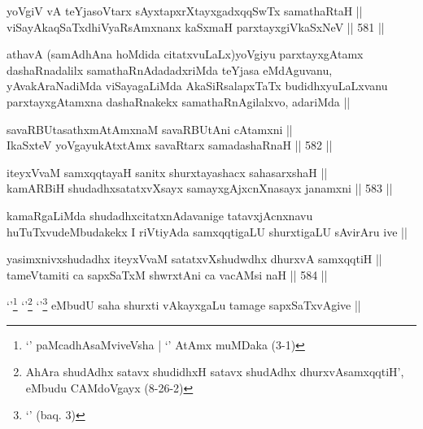 
\begin{shl}
yoVgiV vA teYjasoV\s tarx sAyxtapxrXtayxgadxqqSwTx samathaRtaH || \\
viSayAkaqSaTxdhiVyaRsAmxnanx kaSxmaH parxtayxgiVkaSxNeV ||  581 ||  
\end{shl}

\begin{artha}
athavA (samAdhAna hoMdida citatxvuLaLx)yoVgiyu parxtayxgAtamx
dashaRnadalilx samathaRnAdadadxriMda teYjasa eMdAguvanu,
yAvakAraNadiMda viSayagaLiMda AkaSiRsalapxTaTx budidhxyuLaLxvanu
parxtayxgAtamxna dashaRnakekx samathaRnAgilalxvo, adariMda ||
\end{artha}


\begin{shl}
savaRBUtasathxmAtAmxnaM savaRBUtAni cA\s \s tamxni || \\
IkaSxteV yoVgayukAtxtAmx savaRtarx samadashaRnaH ||  582 ||  
\end{shl}

\begin{shl}
iteyxVvaM samxqqtayaH sanitx shurxtayashacx sahasarxshaH || \\
kamARBiH shudadhxsatatxvXsayx samayxgAjxcnXnasayx janamxni ||  583 ||  
\end{shl}

\begin{artha}
kamaRgaLiMda shudadhxcitatxnAdavanige tatavxjAcnxnavu
huTuTxvudeMbudakekx I riVtiyAda samxqqtigaLU shurxtigaLU sAvirAru ive ||
\end{artha}


\begin{shl}
yasimxnivxshudadhx iteyxVvaM satatxvXshudwdhx dhurxvA samxqqtiH ||  \\
tameVtamiti ca sapxSaTxM shwrxtAni ca vacAMsi naH ||  584 ||  
\end{shl}

\begin{artha}
`\stext'\footnote{`\stext' paMcadhAsaMviveVsha | `\stext' AtAmx
    muMDaka (3-1)} `\stext'\footnote{AhAra shudAdhx satavx shudidhxH
    satavx shudAdhx dhurxvAsamxqqtiH', eMbudu CAMdoVgayx (8-26-2)}
  `\stext'\footnote{`\stext' (baq. 3)} eMbudU saha shurxti vAkayxgaLu tamage sapxSaTxvAgive ||
\end{artha}

